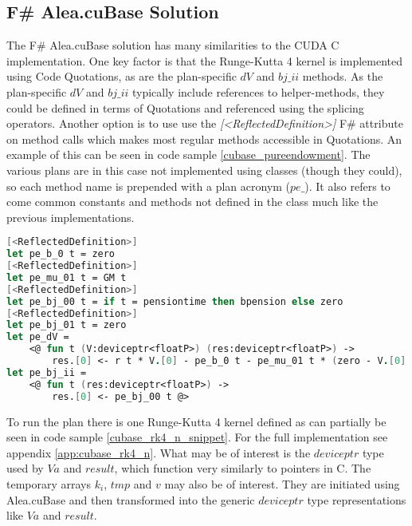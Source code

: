 \subsection{F\# Alea.cuBase Solution}
The F\# Alea.cuBase solution has many similarities to the CUDA C implementation.
One key factor is that the Runge-Kutta 4 kernel is implemented using Code Quotations, as are the plan-specific $dV$ and $bj\_ii$ methods.
As the plan-specific $dV$ and $bj\_ii$ typically include references to helper-methods, they could be defined in terms of Quotations and referenced using the splicing operators.
Another option is to use use the \textit{[\textless{}ReflectedDefinition\textgreater{}]} F\# attribute on method calls which makes most regular methods accessible in Quotations.
An example of this can be seen in code sample \ref{cubase_pureendowment}. 
The various plans are in this case not implemented using classes (though they could), so each method name is prepended with a plan acronym ($pe\_$).
It also refers to come common constants and methods not defined in the class much like the previous implementations.

\begin{lstlisting}[language=FSharp, caption=The pure endowment insurance plan expressed in F\# Alea.cuBase, label=cubase_pureendowment]
[<ReflectedDefinition>] 
let pe_b_0 t = zero
[<ReflectedDefinition>]
let pe_mu_01 t = GM t
[<ReflectedDefinition>]
let pe_bj_00 t = if t = pensiontime then bpension else zero
[<ReflectedDefinition>]
let pe_bj_01 t = zero
let pe_dV = 
	<@ fun t (V:deviceptr<floatP>) (res:deviceptr<floatP>) -> 
		res.[0] <- r t * V.[0] - pe_b_0 t - pe_mu_01 t * (zero - V.[0] + pe_bj_01 t) @>
let pe_bj_ii = 
	<@ fun t (res:deviceptr<floatP>) ->
		res.[0] <- pe_bj_00 t @>
\end{lstlisting}

To run the plan there is one Runge-Kutta 4 kernel defined as can partially be seen in code sample \ref{cubase_rk4_n_snippet}. 
For the full implementation see appendix \ref{app:cubase_rk4_n}. 
What may be of interest is the $deviceptr$ type used by $Va$ and $result$, which function very similarly to pointers in C.
The temporary arrays $k_i$, $tmp$ and $v$ may also be of interest. 
They are initiated using Alea.cuBase and then transformed into the generic $deviceptr$ type representations like $Va$ and $result$.

